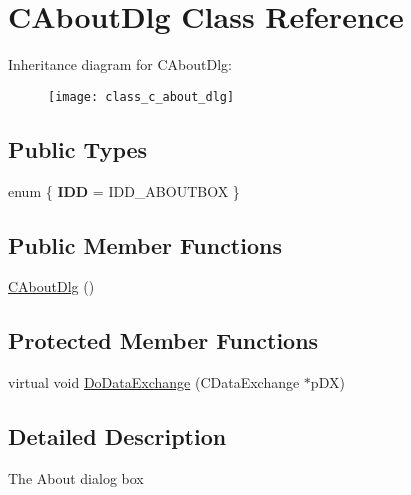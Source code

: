 \hypertarget{class_c_about_dlg}{\section{C\+About\+Dlg Class Reference}
\label{class_c_about_dlg}
}
Inheritance diagram for C\+About\+Dlg\+:\begin{figure}[H]
\begin{center}
\leavevmode
\texttt{[image: class\_c\_about\_dlg]}
\end{center}
\end{figure}
\subsection*{Public Types}
\begin{DoxyCompactItemize}
\item 
\hypertarget{class_c_about_dlg_a27a5d4c47f16acb8562522fcd22871f7}{enum \{ {\bfseries I\+D\+D} = I\+D\+D\+\_\+\+A\+B\+O\+U\+T\+B\+O\+X
 \}}\label{class_c_about_dlg_a27a5d4c47f16acb8562522fcd22871f7}

\end{DoxyCompactItemize}
\subsection*{Public Member Functions}
\begin{DoxyCompactItemize}
\item 
\hyperlink{class_c_about_dlg_a6d1e6a33fef23bee6e75254189d865ce}{C\+About\+Dlg} ()
\end{DoxyCompactItemize}
\subsection*{Protected Member Functions}
\begin{DoxyCompactItemize}
\item 
virtual void \hyperlink{class_c_about_dlg_ab83db7484fec957282d7d5a21aed4df4}{Do\+Data\+Exchange} (C\+Data\+Exchange $\ast$p\+D\+X)
\end{DoxyCompactItemize}


\subsection{Detailed Description}
The About dialog box 

